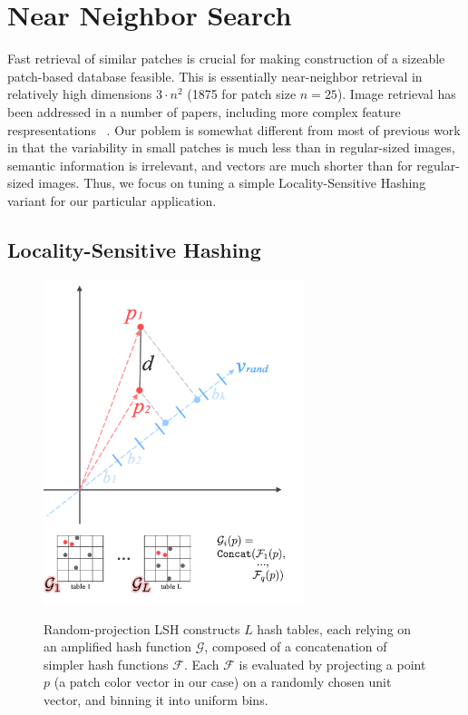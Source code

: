 \section{Near Neighbor Search}\label{sec:nn}

Fast retrieval of similar patches is crucial for making
construction of a sizeable patch-based database feasible.
This is essentially near-neighbor retrieval in
relatively high dimensions $3 \cdot n^2$ (1875 for patch size $n=25$).
Image retrieval has been addressed in a number of papers,
including more complex feature respresentations ~\cite{perronnin2010large}.
Our poblem is somewhat different from most of previous work
in that the variability
in small patches is much less than in regular-sized images,
semantic information is irrelevant, and vectors are much shorter
than for regular-sized images.
Thus, we focus on tuning a simple Locality-Sensitive Hashing variant for our
particular application.

\subsection{Locality-Sensitive Hashing}

\begin{figure}[ht!]
\includegraphics[width=3.0in]{fig_NN/rand_proj_all.png}
\label{fig:lsh}
\caption{Random-projection LSH constructs
$L$ hash tables, each relying on an amplified
hash function $\mathcal{G}$, composed of a concatenation
of simpler hash functions $\mathcal{F}$. Each
$\mathcal{F}$ is evaluated by projecting a point $p$
(a patch color vector in our case) on a randomly chosen
unit vector, and binning it into uniform bins.}
\end{figure}

